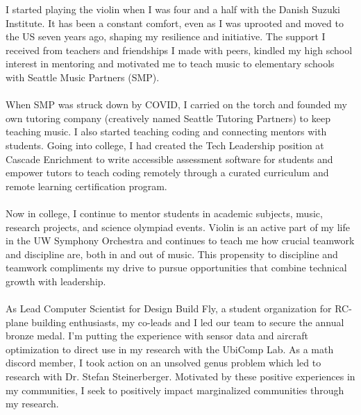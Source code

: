 \documentclass{article}
\title{\StrSubstitute{\jobname}{"}{}}
\author{Alexander Metzger}
\date{}
\begin{document}
\maketitle

I started playing the violin when I was four and a half with the Danish Suzuki
Institute. It has been a constant comfort, even as I was uprooted and moved to the US
seven years ago, shaping my resilience and initiative. The support I received from teachers
and friendships I made with peers, kindled my high school interest in mentoring and
motivated me to teach music to elementary schools with Seattle Music Partners (SMP).
\\\\
\indent When SMP was struck down by COVID, I carried on the torch and founded my own
tutoring company (creatively named Seattle Tutoring Partners) to keep teaching music. I
also started teaching coding and connecting mentors with students. Going into college, I
had created the Tech Leadership position at Cascade Enrichment to write accessible
assessment software for students and empower tutors to teach coding remotely through a
curated curriculum and remote learning certification program.
\\\\
\indent Now in college, I continue to mentor students in academic subjects, music, research
projects, and science olympiad events. Violin is an active part of my life in the UW
Symphony Orchestra and continues to teach me how crucial teamwork and discipline are,
both in and out of music. This propensity to discipline and teamwork compliments my
drive to pursue opportunities that combine technical growth with leadership.
\\\\
\indent As Lead Computer Scientist for Design Build Fly, a student organization for
RC-plane building enthusiasts, my co-leads and I led our team to secure the annual bronze
medal. I'm putting the experience with sensor data and aircraft optimization to direct use
in my research with the UbiComp Lab. As a math discord member, I took action on an
unsolved genus problem which led to research with Dr. Stefan Steinerberger. Motivated by
these positive experiences in my communities, I seek to positively impact marginalized
communities through my research.
\end{document}
